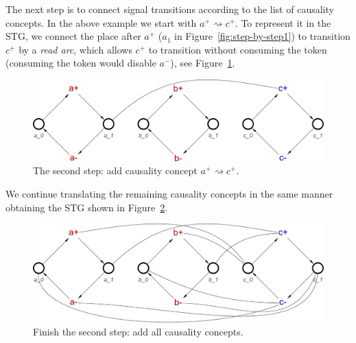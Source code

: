 \documentclass[british, journal]{IEEEtran}
\begin{document}
The next step is to connect signal transitions according to the list of
causality
concepts. In the above example we start with $a^{+}\rightsquigarrow c^{+}$.
To represent it in the STG, we connect the place after $a^{+}$ ($a_1$ in
Figure~\ref{fig:step-by-step1}) to transition $c^{+}$ by a \emph{read arc},
which allows $c^{+}$ to transition without consuming the token (consuming
the token would disable $a^{-}$), see Figure~\ref{fig:step-by-step2}.

\vspace{-2mm}
\begin{figure}[h]
\begin{centering}
\includegraphics[scale=0.23]{Images/Step-by-step2}
\par
\protect\caption{\label{fig:step-by-step2}The second step: add causality concept
$a^{+}\rightsquigarrow c^{+}$.}
\vspace{-2mm}
\end{centering}
\end{figure}

We continue translating the remaining causality concepts in the same manner
obtaining the STG shown in Figure~\ref{fig:step-by-step9}.

\begin{figure}[h]
\begin{centering}
\includegraphics[scale=0.23]{Images/Step-by-step9}
\par
\protect\caption{\label{fig:step-by-step9}Finish the second step: add all
causality concepts.}
\vspace{-2mm}
\par\end{centering}
\end{figure}
\end{document}
